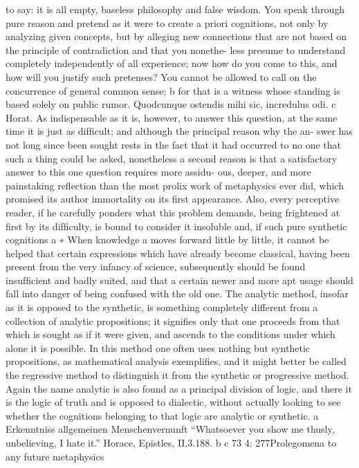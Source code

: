 to say: it is all empty, baseless philosophy and false wisdom. You speak
through pure reason and pretend as it were to create a priori cognitions,
not only by analyzing given concepts, but by alleging new connections
that are not based on the principle of contradiction and that you nonethe-
less presume to understand completely independently of all experience;
now how do you come to this, and how will you justify such pretenses?
You cannot be allowed to call on the concurrence of general common
sense; b for that is a witness whose standing is based solely on public
rumor. Quodcunque ostendis mihi sic, incredulus odi. c Horat.
As indispensable as it is, however, to answer this question, at the same
time it is just as difﬁcult; and although the principal reason why the an-
swer has not long since been sought rests in the fact that it had occurred
to no one that such a thing could be asked, nonetheless a second reason
is that a satisfactory answer to this one question requires more assidu-
ous, deeper, and more painstaking reﬂection than the most prolix work
of metaphysics ever did, which promised its author immortality on its
ﬁrst appearance. Also, every perceptive reader, if he carefully ponders
what this problem demands, being frightened at ﬁrst by its difﬁculty, is
bound to consider it insoluble and, if such pure synthetic cognitions a
∗ When knowledge a moves forward little by little, it cannot be helped that certain
expressions which have already become classical, having been present from the
very infancy of science, subsequently should be found insufﬁcient and badly
suited, and that a certain newer and more apt usage should fall into danger of
being confused with the old one. The analytic method, insofar as it is opposed
to the synthetic, is something completely different from a collection of analytic
propositions; it signiﬁes only that one proceeds from that which is sought as if
it were given, and ascends to the conditions under which alone it is possible. In
this method one often uses nothing but synthetic propositions, as mathematical
analysis exempliﬁes, and it might better be called the regressive method to
distinguish it from the synthetic or progressive method. Again the name analytic
is also found as a principal division of logic, and there it is the logic of truth and
is opposed to dialectic, without actually looking to see whether the cognitions
belonging to that logic are analytic or synthetic.
a Erkenntniss
allgemeinen Menschenvernunft
“Whatsoever you show me thusly, unbelieving, I hate it.” Horace, Epistles, II.3.188.
b
c
73
4: 277Prolegomena to any future metaphysics
